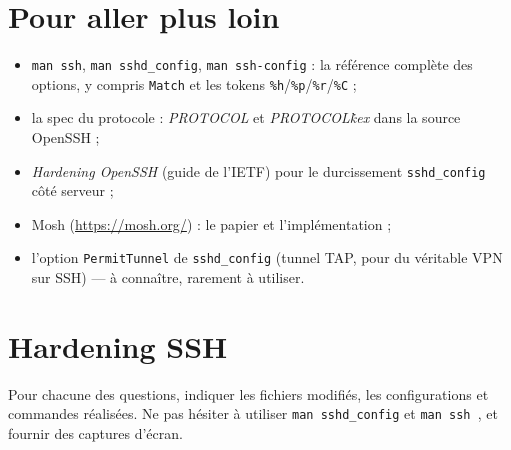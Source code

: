 \documentclass[a4paper,10pt]{exam}
\begin{document}
\section{Pour aller plus loin}

\begin{itemize}
  \item \texttt{man ssh}, \texttt{man sshd\_config}, \texttt{man ssh-config} : la référence
        complète des options, y compris \texttt{Match} et les tokens
        \texttt{\%h}/\texttt{\%p}/\texttt{\%r}/\texttt{\%C} ;
  \item la spec du protocole : \emph{PROTOCOL} et \emph{PROTOCOL\.kex} dans la source
        OpenSSH ;
  \item \emph{Hardening OpenSSH} (guide de l'IETF) pour le durcissement
        \texttt{sshd\_config} côté serveur ;
  \item Mosh (\url{https://mosh.org/}) : le papier et l'implémentation ;
  \item l'option \texttt{PermitTunnel} de \texttt{sshd\_config} (tunnel TAP, pour du
        véritable VPN sur SSH) — à connaître, rarement à utiliser.
\end{itemize}

\section{Hardening SSH}\label{hardening-ssh}

Pour chacune des questions, indiquer les fichiers modifiés, les
configurations et commandes réalisées. Ne pas hésiter à utiliser
\texttt{man\ sshd\_config} et \texttt{man\ ssh }, et fournir des captures d'écran.
\end{document}
